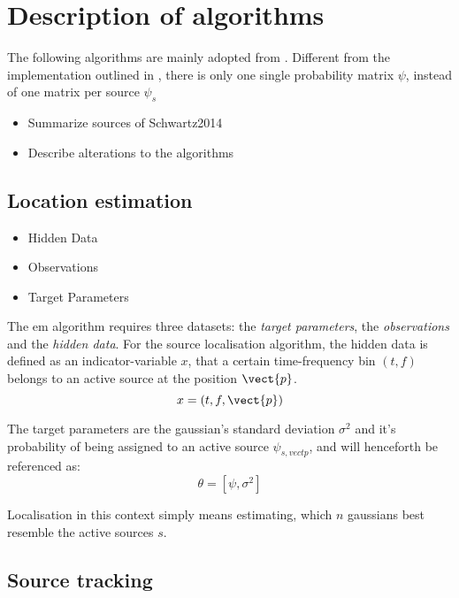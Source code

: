 \chapter{Description of algorithms}
\label{chap:algorithms}
The following algorithms are mainly adopted from \cite{Schwartz2014}. Different from the implementation outlined in \cite{Schwartz2014}, there is only one single probability matrix $\psi$, instead of one matrix per source $\psi_{s}$
\begin{itemize}
	\item Summarize sources of Schwartz2014
	\item Describe alterations to the algorithms
\end{itemize}

\section{Location estimation}
\label{sec:algLocEst}
\begin{itemize}
	\item Hidden Data
	\item Observations
	\item Target Parameters
\end{itemize}

The \gls{em} algorithm requires three datasets: the \emph{target parameters}, the \emph{observations} and the \emph{hidden data}. For the source localisation algorithm, the hidden data is defined as an indicator-variable $x$, that a certain time-frequency bin $(t,f)$ belongs to an active source at the position $\vect{p}$. 
\begin{equation}
	x=(t,f,\vect{p})
\end{equation}

The target parameters are the gaussian's standard deviation $\sigma^2$ and it's probability of being assigned to an active source $\psi_{s,vect{p}}$, and will henceforth be referenced as:
\begin{equation}
	\theta=[\psi, \sigma^2]
\end{equation}

Localisation in this context simply means estimating, which $n$ gaussians best resemble the active sources $s$.

\section{Source tracking}
\label{sec:algSrcTrack}


